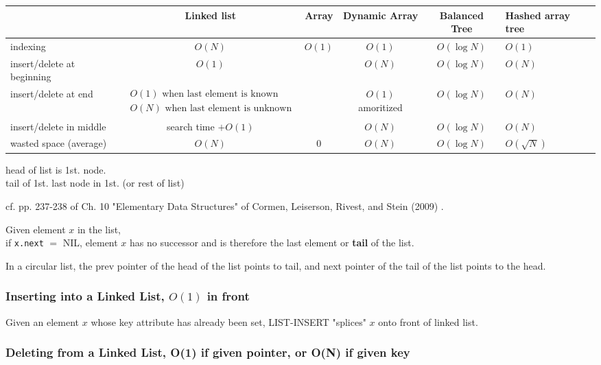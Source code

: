 \documentclass[10pt]{amsart}
\begin{document}
\begin{multicols*}{2}
\begin{center}
	\begin{tabular}{ l | c | c | c | c | p{50pt} }
		\hline
		& Linked list & Array & Dynamic Array & Balanced Tree & Hashed \newline array tree \\ \hline 
		indexing & $O(N)$ & $O(1)$ & $O(1)$ & $O(\log{N})$ & $O(1)$ \\ \hline 
		insert/delete at beginning & $O(1)$ &  & $O(N)$ & $O(\log{N})$ & $O(N)$ \\ \hline 
		insert/delete at end & $\begin{gathered} O(1) \text{ when last element is known } \\ O(N) \text{ when last element is unknown }\end{gathered}$ &  & $O(1)$ amoritized  & $O(\log{N})$  & $O(N)$ \\ \hline 
		insert/delete in middle & search time $+ O(1)$ &  & $O(N)$ & $O(\log{N})$ & $O(N)$ \\ \hline 
		wasted space (average) & $O(N)$ & 0  & $O(N)$ & $O(\log{N})$ & $O(\sqrt{N})$ \\ \hline 
		\hline
	\end{tabular}
\end{center}

head of list is 1st. node. \\
tail of 1st. last node in 1st. (or rest of list)

cf. pp. 237-238 of Ch. 10 "Elementary Data Structures" of Cormen, Leiserson, Rivest, and Stein (2009) \cite{CLRS2009}.

Given element $x$ in the list, \\
if \verb|x.next| $=$ NIL, element $x$ has no successor and is therefore the last element or \textbf{tail} of the list.

In a circular list, the prev pointer of the head of the list points to tail, and next pointer of the tail of the list points to the head.

\subsubsection{Inserting into a Linked List, $O(1)$ in front}

Given an element $x$ whose key attribute has already been set, LIST-INSERT "splices" $x$ onto front of linked list.

\subsubsection{Deleting from a Linked List, O(1) if given pointer, or O(N) if given key}


\end{multicols*}
\end{document}
